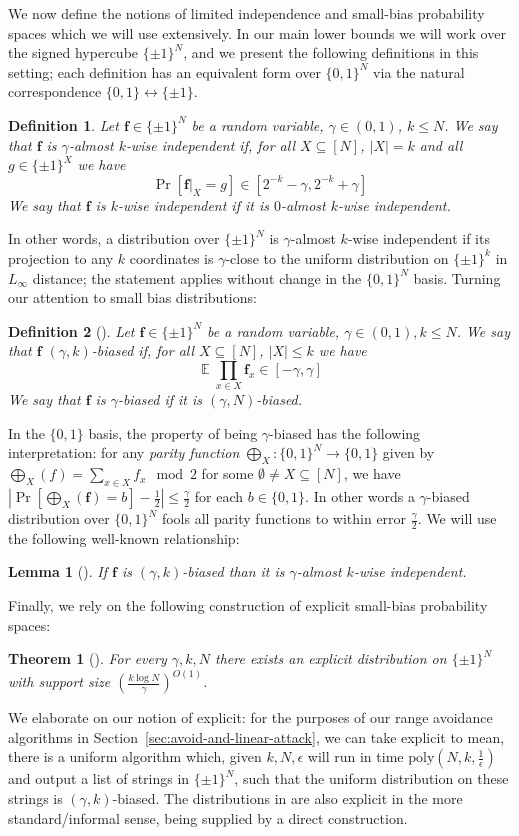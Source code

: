 \documentclass[11pt]{article}
\newtheorem*{theorem*}{Theorem}
\newtheorem{lemma}{Lemma}
\newtheorem{definition}{Definition}
\newcommand{\B}{\{0,1\}}
\newcommand{\poly}{\mathrm{poly}}
\newcommand{\E}{\mathop{\mathbb{E}}}
\newcommand{\N}{[N]}
\begin{document}
We now define the notions of limited independence and small-bias probability spaces which we will use extensively. In our main lower bounds we will work over the signed hypercube $\{\pm 1\}^N$, and we present the following definitions in this setting; each definition has an equivalent form over $\B^N$ via the natural correspondence $\B \leftrightarrow\{\pm 1\}$. 
\begin{definition}
Let $\bm{f}\in \{\pm 1\}^N$ be a random variable, $\gamma\in (0,1)$, $k \leq N$. We say that $\bm{f}$ is $\gamma$-almost $k$-wise independent if, for all $X \subseteq \N$, $|X|= k$ and all $g\in \{\pm 1\}^X$ we have
\[
\Pr[\bm{f}|_{X} = g] \in [2^{-k}-\gamma, 2^{-k}+\gamma]
\]
We say that $\bm{f}$ is $k$-wise independent if it is $0$-almost $k$-wise independent.
\end{definition}
In other words, a distribution over $\{\pm 1\}^N$ is $\gamma$-almost $k$-wise independent if its projection to any $k$ coordinates is $\gamma$-close to the uniform distribution on $\{\pm 1\}^k$ in $L_{\infty}$ distance; the statement applies without change in the $\B^N$ basis. Turning our attention to small bias distributions:
\begin{definition}[\cite{naornaor}]
Let $\bm{f} \in \{\pm 1\}^N$ be a random variable, $\gamma\in (0,1), k \leq N$. We say that $\bm{f}$ $(\gamma,k)$-biased if, for all $X \subseteq \N$, $|X|\leq k$ we have
\[
\E \prod_{x\in X} \bm{f}_x \in [-\gamma,\gamma]
\]
We say that $\bm{f}$ is $\gamma$-biased if it is $(\gamma,N)$-biased.
\end{definition}
In the $\B$ basis, the property of being $\gamma$-biased has the following interpretation: for any \emph{parity function} $\bigoplus_X: \B^N \to \B$ given by $\bigoplus_X(f) = \sum_{x \in X} f_x \mod 2$ for some $\emptyset \neq X \subseteq \N$, we have $|\Pr[\bigoplus_X(\bm{f}) = b] - \frac{1}{2}| \leq \frac{\gamma}{2}$ for each $b \in \B$. In other words a $\gamma$-biased distribution over $\B^N$ fools all parity functions to within error $\frac{\gamma}{2}$. We will use the following well-known relationship:
\begin{lemma}[\cite{naornaor}]\label{lem:bias-vs-indep}
If $\bm{f}$ is $(\gamma,k)$-biased than it is $\gamma$-almost $k$-wise independent.
\end{lemma}

Finally, we rely on the following construction of explicit small-bias probability spaces:
\begin{theorem*}[\cite{naornaor}]
For every $\gamma,k,N$ there exists an explicit distribution on $\{\pm 1\}^N$ with support size $(\frac{k\log N}{\gamma})^{O(1)}$.
\end{theorem*}
We elaborate on our notion of explicit: for the purposes of our range avoidance algorithms in Section~\ref{sec:avoid-and-linear-attack}, we can take explicit to mean, there is a uniform algorithm which, given $k,N,\epsilon$ will run in time $\poly(N, k, \frac{1}{\epsilon})$ and output a list of strings in $\{\pm 1\}^N$, such that the uniform distribution on these strings is $(\gamma,k)$-biased. The distributions in \cite{naornaor} are also explicit in the more standard/informal sense, being supplied by a direct construction. 
\end{document}
